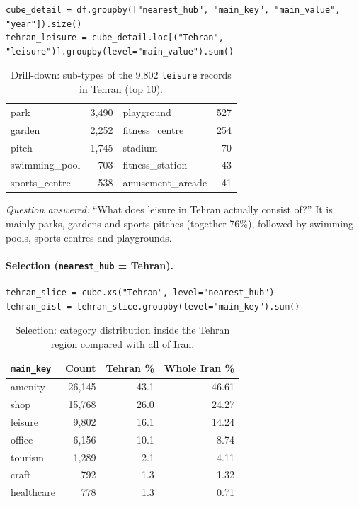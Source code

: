 \documentclass[11pt,a4paper]{article}
\newcommand{\col}[1]{\texttt{#1}}
\begin{document}
\begin{lstlisting}
cube_detail = df.groupby(["nearest_hub", "main_key", "main_value", "year"]).size()
tehran_leisure = cube_detail.loc[("Tehran", "leisure")].groupby(level="main_value").sum()
\end{lstlisting}

\begin{table}[H]
\centering
\caption{Drill-down: sub-types of the 9{,}802 \col{leisure} records in Tehran (top 10).}
\begin{tabular}{lr@{\hspace{1.2cm}}lr}
\toprule
park          & 3{,}490 & playground       & 527 \\
garden        & 2{,}252 & fitness\_centre  & 254 \\
pitch         & 1{,}745 & stadium          & 70 \\
swimming\_pool & 703    & fitness\_station & 43 \\
sports\_centre & 538    & amusement\_arcade & 41 \\
\bottomrule
\end{tabular}
\end{table}

\noindent\textit{Question answered:} ``What does leisure in Tehran actually consist of?''
It is mainly parks, gardens and sports pitches (together 76\%), followed by swimming pools,
sports centres and playgrounds.

\paragraph{Selection (\col{nearest\_hub} = Tehran).}
\begin{lstlisting}
tehran_slice = cube.xs("Tehran", level="nearest_hub")
tehran_dist = tehran_slice.groupby(level="main_key").sum()
\end{lstlisting}

\begin{table}[H]
\centering
\caption{Selection: category distribution inside the Tehran region compared with all of Iran.}
\begin{tabular}{lrrr}
\toprule
\col{main\_key} & \textbf{Count} & \textbf{Tehran \%} & \textbf{Whole Iran \%} \\
\midrule
amenity    & 26{,}145 & 43.1 & 46.61 \\
shop       & 15{,}768 & 26.0 & 24.27 \\
leisure    & 9{,}802  & 16.1 & 14.24 \\
office     & 6{,}156  & 10.1 & 8.74 \\
tourism    & 1{,}289  & 2.1  & 4.11 \\
craft      & 792      & 1.3  & 1.32 \\
healthcare & 778      & 1.3  & 0.71 \\
\bottomrule
\end{tabular}
\end{table}
\end{document}

